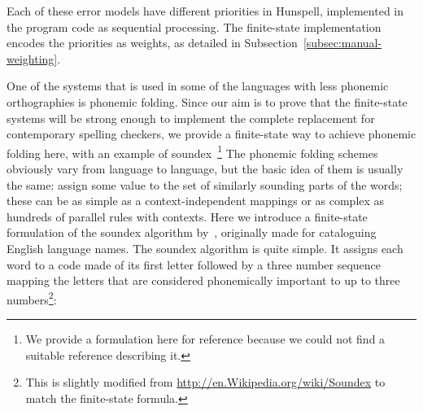 \documentclass[a4paper,12pt]{article}
\begin{document}
Each of these error models have different priorities in Hunspell, implemented
in the program code as sequential processing. The finite-state implementation
encodes the priorities as weights, as detailed in
Subsection~\ref{subsec:manual-weighting}.

One of the systems that is used in some of the languages with less phonemic
orthographies is phonemic folding. Since our aim is to prove that the
finite-state systems will be strong enough to implement the complete
replacement for contemporary spelling checkers, we provide a finite-state way
to achieve phonemic folding here, with an example of soundex~\footnote{We 
provide a formulation here for reference because we could not find a suitable
reference describing it.} The phonemic folding
schemes obviously vary from language to language, but the basic idea of them is
usually the same: assign some value to the set of similarly sounding parts of
the words; these can be as simple as a context-independent mappings or as
complex as hundreds of parallel rules with contexts. Here we introduce a
finite-state formulation of the soundex algorithm by~\cite{russell1918soundex},
originally made for cataloguing English language names. The soundex algorithm
is quite simple. It assigns each word to a code made of its first letter
followed by a three number sequence mapping the letters that are considered
phonemically important to up to three numbers\footnote{This is slightly
modified from \url{http://en.Wikipedia.org/wiki/Soundex} to match the
finite-state formula.}:
\end{document}
